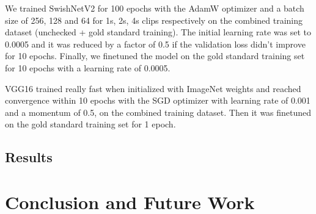 \documentclass{article}
\begin{document}
We trained SwishNetV2 for 100 epochs with the AdamW optimizer \cite{loshchilov2017decoupled} and a batch size of 256, 128 and 64 for 1s, 2s, 4s clips respectively on the combined training dataset (unchecked + gold standard training). The initial learning rate was set to 0.0005 and it was reduced by a factor of 0.5 if the validation loss didn't improve for 10 epochs. Finally, we finetuned the model on the gold standard training set for 10 epochs with a learning rate of 0.0005.

VGG16 trained really fast when initialized with ImageNet weights and reached convergence within 10 epochs with the SGD optimizer with learning rate of 0.001 and a momentum of 0.5, on the combined training dataset. Then it was finetuned on the gold standard training set for 1 epoch.

\subsection{Results}





\section{Conclusion and Future Work}


\printbibliography
\end{document}
